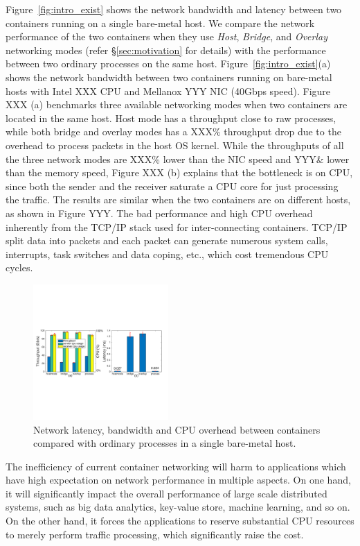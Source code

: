 Figure~\ref{fig:intro_exist} shows the network bandwidth and latency between
two containers running on a single bare-metal host. We compare the network
performance of the two containers when they use {\em Host}, {\em Bridge}, and {\em Overlay} networking modes (refer \S\ref{sec:motivation} for details) with
the performance between two ordinary processes on the same host. 
Figure~\ref{fig:intro_exist}(a) shows 
the network bandwidth between two containers running on bare-metal hosts with 
Intel XXX CPU and Mellanox YYY NIC (40Gbps speed). Figure XXX (a) benchmarks
three available networking modes when two containers are located in the same 
host. Host mode has a throughput close to raw processes, while both bridge
and overlay modes has a XXX\% throughput drop due to the overhead to 
process packets in the host OS kernel. While the throughputs of all the three
network modes are XXX\% lower than the NIC speed and YYY\& lower than the memory
speed, Figure XXX (b) explains that the bottleneck is on CPU, since both
the sender and the receiver saturate a CPU core for just processing the traffic.
The results are similar when the two containers are on different hosts, as shown
in Figure YYY. The bad performance and high CPU overhead inherently from 
the TCP/IP stack used for inter-connecting containers. TCP/IP split data into 
packets and each packet can generate numerous system calls, interrupts, task 
switches and data coping, etc., which cost tremendous CPU cycles.

\begin{figure}[t!]
     \centering 
     \includegraphics[width=0.46\textwidth]{figures/intro/intro_exist2.pdf} 
     \caption{Network latency, bandwidth and CPU overhead between containers compared with ordinary processes in a single bare-metal host. } 
     \label{fig:intro-exist}
\end{figure} 

The inefficiency of current container networking will harm to applications which
have high expectation on network performance in multiple aspects. On one hand,
it will significantly impact the overall performance of large scale distributed systems, such as big data analytics, key-value store, machine learning, and so on.
On the other hand, it forces the applications to reserve substantial CPU
resources to merely perform traffic processing, which significantly raise the 
cost.

